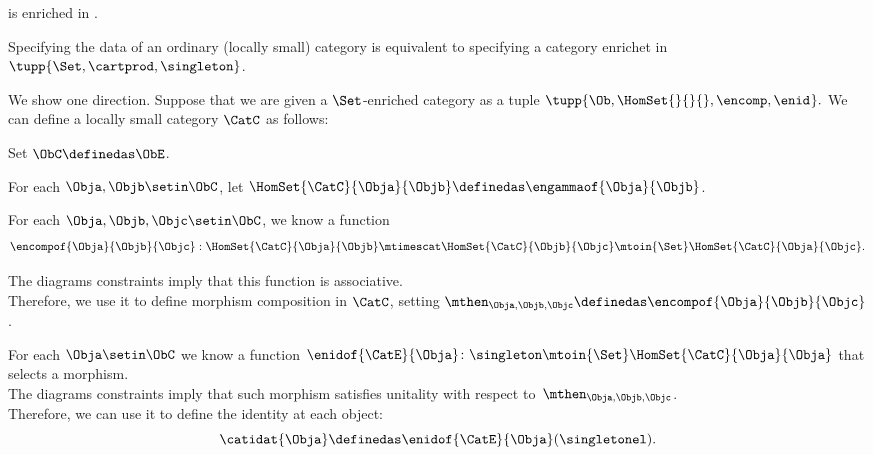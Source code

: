 {    \begin{example}
        \Category is enriched in \Category.
    \end{example}

    \begin{exercise}
        \label{ex:every-cat-set}
        Specifying the data of an ordinary (locally small) category is equivalent to specifying a category enrichet in $\tupp{\Set,\cartprod, \singleton}$.
    \end{exercise}
    \begin{solution}
        We show one direction.
        Suppose that we are given a $\Set$-enriched category as a tuple
        $\tupp{\Ob, \HomSet{}{}{}, \encomp, \enid_{}}.
        $
        We can define a locally small category $\CatC$  as follows:
        \begin{compactitem}
            \item Set $\ObC \definedas \ObE$.
            \item For each $\Obja,\Objb\setin\ObC$, let $\HomSet{\CatC}{\Obja}{\Objb} \definedas \engammaof{\Obja}{\Objb}$.
            \item For each $\Obja,\Objb,\Objc \setin \ObC$, we know a function
                  \begin{equation}
                      \encompof{\Obja}{\Objb}{\Objc}:\HomSet{\CatC}{\Obja}{\Objb}\mtimescat \HomSet{\CatC}{\Objb}{\Objc}\mtoin{\Set} \HomSet{\CatC}{\Obja}{\Objc}.
                  \end{equation}

                  The diagrams constraints imply that this function is associative.
                  \\Therefore, we use it to define morphism composition in $\CatC$, setting $\mthen_{\Obja,\Objb,\Objc}\definedas \encompof{\Obja}{\Objb}{\Objc}$.
            \item For each $\Obja\setin\ObC$ we know a function $\enidof{\CatE}{\Obja}\colon\singleton\mtoin{\Set} \HomSet{\CatC}{\Obja}{\Obja}$ that selects a morphism.\\
                  The diagrams constraints imply that such morphism satisfies unitality
                  with respect to~$\mthen_{\Obja,\Objb,\Objc}$. \\Therefore, we can use it to define the identity at each object:
                  \begin{equation}
                      \label{eq:ja-hom}
                      \catidat{\Obja} \definedas \enidof{\CatE}{\Obja}(\singletonel).
                  \end{equation}
        \end{compactitem}
    \end{solution}

}
